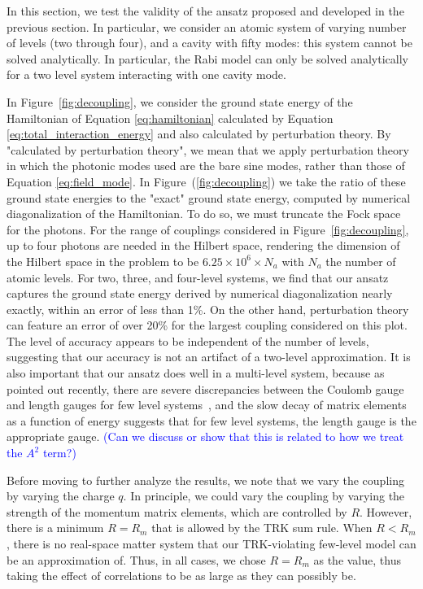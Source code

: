 \documentclass[aps,prb,twocolumn,
	groupedaddress,superscriptaddress,
	amsfonts,amssymb,amsmath,floatfix,
	citeautoscript]{revtex4-1}
\newcommand{\Jadd}[1]{\textcolor{blue}{#1}}
\begin{document}
In this section, we test the validity of the ansatz proposed and developed in the previous section. In particular, we consider an atomic system of varying number of levels (two through four), and a cavity with fifty modes: this system cannot be solved analytically. In particular, the Rabi model can only be solved analytically for a two level system interacting with one cavity mode. 

In Figure~\ref{fig:decoupling}, we consider the ground state energy of the Hamiltonian of Equation \ref{eq:hamiltonian}  calculated by Equation \ref{eq:total_interaction_energy} and also calculated by perturbation theory. By "calculated by perturbation theory", we mean that we apply perturbation theory in which the photonic modes used are the bare sine modes, rather than those of Equation \ref{eq:field_mode}.  In Figure~(\ref{fig:decoupling}) we take the ratio of these ground state energies to the "exact" ground state energy, computed by numerical diagonalization of the Hamiltonian. To do so, we must truncate the Fock space for the photons. For the range of couplings considered in Figure~\ref{fig:decoupling}, up to four photons are needed in the Hilbert space, rendering the dimension of the Hilbert space in the problem to be $6.25\times10^6 \times N_a$ with $N_a$ the number of atomic levels. For two, three, and four-level systems, we find that our ansatz captures the ground state energy derived by numerical diagonalization nearly exactly, within an error of less than 1\%. On the other hand, perturbation theory can feature an error of over 20\% for the largest coupling considered on this plot. The level of accuracy appears to be independent of the number of levels, suggesting that our accuracy is not an artifact of a two-level approximation. It is also important that our ansatz does well in a multi-level system, because as pointed out recently, there are severe discrepancies between the Coulomb gauge and length gauges for few level systems~\cite{schaefer2018, bernardis2018}, and the slow decay of matrix elements as a function of energy suggests that for few level systems, the length gauge is the appropriate gauge. \Jadd{(Can we discuss or show that this is related to how we treat the $A^2$ term?)}

Before moving to further analyze the results, we note that we vary the coupling by varying the charge $q$. In principle, we could vary the coupling by varying the strength of the momentum matrix elements, which are controlled by $R$. However, there is a minimum $R=R_{m}$ that is allowed by the TRK sum rule. When $R < R_m$, there is no real-space matter system that our TRK-violating  few-level model can be an approximation of. Thus, in all cases, we chose $R=R_m$ as the value, thus taking the effect of correlations to be as large as they can possibly be.
\end{document}
